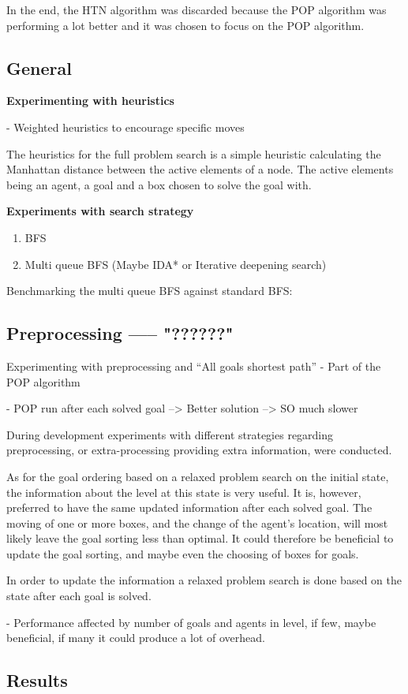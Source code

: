 \documentclass[Main]{subfiles}
\begin{document}
In the end, the HTN algorithm was discarded because the POP algorithm was performing a lot better and it was chosen to focus on the POP algorithm.




\subsection{General} 


\textbf{Experimenting with heuristics}

- Weighted heuristics to encourage specific moves

The heuristics for the full problem search is a simple heuristic calculating the Manhattan distance between the active elements of a node. The active elements being an agent, a goal and a box chosen to solve the goal with. 




\textbf{Experiments with search strategy}

\begin{enumerate}
    \item BFS 
    \item Multi queue BFS (Maybe IDA* or Iterative deepening search)
\end{enumerate}



Benchmarking the multi queue BFS against standard BFS:





\subsection{Preprocessing ----- "??????" }

Experimenting with preprocessing and ``All goals shortest path'' 
- Part of the POP algorithm

- POP run after each solved goal 
--> Better solution --> SO much slower


During development experiments with different strategies regarding preprocessing, or extra-processing providing extra information, were conducted. 

As for the goal ordering based on a relaxed problem search on the initial state, the information about the level at this state is very useful. It is, however, preferred to have the same updated information after each solved goal. The moving of one or more boxes, and the change of the agent's location, will most likely leave the goal sorting less than optimal. It could therefore be beneficial to update the goal sorting, and maybe even the choosing of boxes for goals. 

In order to update the information a relaxed problem search is done based on the state after each goal is solved. 


- Performance affected by number of goals and agents in level, if few, maybe beneficial, if many it could produce a lot of overhead.






\subsection{Results}
\end{document}
